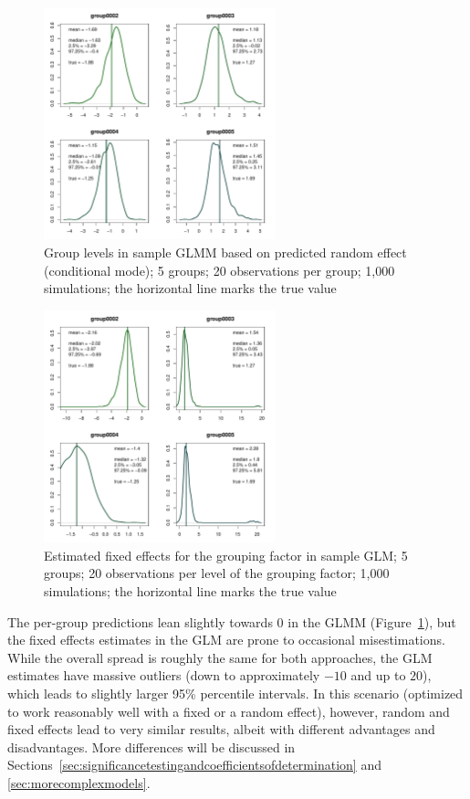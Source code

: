 \documentclass[a4paper,12pt]{article}
\begin{document}
\begin{figure}[!htpb]
  \centering
  \includegraphics[width=0.6\textwidth]{graphics/glmmj5i20}
  \caption{Group levels in sample GLMM based on predicted random effect (conditional mode); 5 groups; 20 observations per group; 1,000 simulations; the horizontal line marks the true value}
  \label{fig:glmmj5i20}
\end{figure}
\begin{figure}[!htpb]
  \centering
  \includegraphics[width=0.6\textwidth]{graphics/glmj5i20}
  \caption{Estimated fixed effects for the grouping factor in sample GLM; 5 groups; 20 observations per level of the grouping factor; 1,000 simulations; the horizontal line marks the true value}
  \label{fig:glmj5i20}
\end{figure}

The per-group predictions lean slightly towards $0$ in the GLMM (Figure~\ref{fig:glmmj5i20}), but the fixed effects estimates in the GLM are prone to occasional misestimations.
While the overall spread is roughly the same for both approaches, the GLM estimates have massive outliers (down to approximately $-10$ and up to $20$), which leads to slightly larger 95\% percentile intervals.
In this scenario (optimized to work reasonably well with a fixed or a random effect), however, random and fixed effects lead to very similar results, albeit with different advantages and disadvantages.
More differences will be discussed in Sections~\ref{sec:significancetestingandcoefficientsofdetermination} and \ref{sec:morecomplexmodels}.
\end{document}
